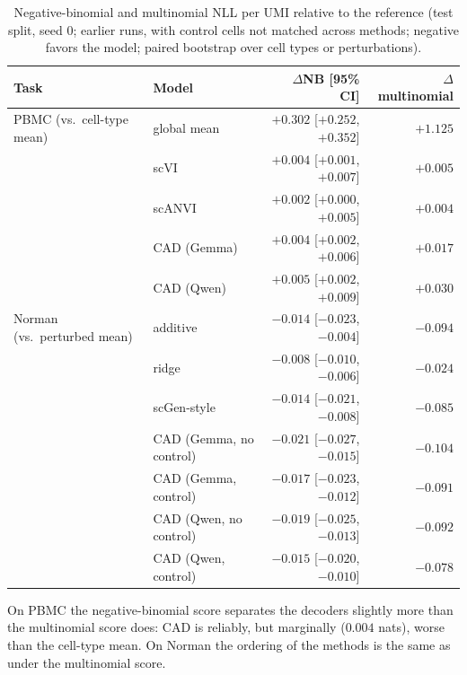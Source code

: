 \documentclass[10pt]{article}
\newcommand{\cadc}{CAD}
\begin{document}
\begin{table}[!htb]
\centering
\scriptsize
\begin{tabular}{llrr}
\toprule
Task & Model & $\Delta$NB [95\% CI] & $\Delta$multinomial \\
\midrule
PBMC (vs.\ cell-type mean) & global mean & $+0.302$ [$+0.252$, $+0.352$] & $+1.125$ \\
 & scVI & $+0.004$ [$+0.001$, $+0.007$] & $+0.005$ \\
 & scANVI & $+0.002$ [$+0.000$, $+0.005$] & $+0.004$ \\
 & \cadc{} (Gemma) & $+0.004$ [$+0.002$, $+0.006$] & $+0.017$ \\
 & \cadc{} (Qwen) & $+0.005$ [$+0.002$, $+0.009$] & $+0.030$ \\
\midrule
Norman (vs.\ perturbed mean) & additive & $-0.014$ [$-0.023$, $-0.004$] & $-0.094$ \\
 & ridge & $-0.008$ [$-0.010$, $-0.006$] & $-0.024$ \\
 & scGen-style & $-0.014$ [$-0.021$, $-0.008$] & $-0.085$ \\
 & \cadc{} (Gemma, no control) & $-0.021$ [$-0.027$, $-0.015$] & $-0.104$ \\
 & \cadc{} (Gemma, control) & $-0.017$ [$-0.023$, $-0.012$] & $-0.091$ \\
 & \cadc{} (Qwen, no control) & $-0.019$ [$-0.025$, $-0.013$] & $-0.092$ \\
 & \cadc{} (Qwen, control) & $-0.015$ [$-0.020$, $-0.010$] & $-0.078$ \\
\bottomrule
\end{tabular}
\caption{Negative-binomial and multinomial NLL per UMI relative to the reference (test split, seed 0; earlier runs, with control cells not matched across methods; negative favors the model; paired bootstrap over cell types or perturbations).}
\label{tab:nb}
\end{table}

On PBMC the negative-binomial score separates the decoders slightly more than the multinomial score does: \cadc{} is reliably, but marginally ($0.004$ nats), worse than the cell-type mean.
On Norman the ordering of the methods is the same as under the multinomial score.

\FloatBarrier
\end{document}
